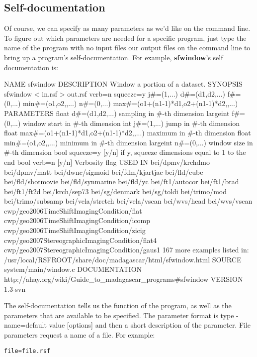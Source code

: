 \subsection{Self-documentation}
Of course, we can specify as many parameters as we'd like on the command line. To figure out which parameters are needed for a specific program, just type the name of the program with no input files our output files on the command line to bring up a program's self-documentation.  For example, \textbf{sfwindow}'s self documentation is:
\begin{verbatimtab}[4]
NAME
	sfwindow
DESCRIPTION
	Window a portion of a dataset. 
SYNOPSIS
	sfwindow < in.rsf > out.rsf verb=n squeeze=y 
        j#=(1,...) d#=(d1,d2,...) f#=(0,...) min#=(o1,o2,,...) 
        n#=(0,...) max#=(o1+(n1-1)*d1,o2+(n1-1)*d2,,...)
PARAMETERS
        float   d#=(d1,d2,...)  sampling in #-th dimension 
        largeint f#=(0,...)     window start in #-th dimension 
        int     j#=(1,...)      jump in #-th dimension 
        float   max#=(o1+(n1-1)*d1,o2+(n1-1)*d2,,...)   
            maximum in #-th dimension 
        float   min#=(o1,o2,,...)       minimum in #-th dimension 
        largeint n#=(0,...)     window size in #-th dimension 
        bool    squeeze=y [y/n] 
            if y, squeeze dimensions equal to 1 to the end 
        bool    verb=n [y/n]    Verbosity flag
USED IN
	bei/dpmv/krchdmo
	bei/dpmv/matt
	bei/dwnc/sigmoid
	bei/fdm/kjartjac
	bei/fld/cube
	bei/fld/shotmovie
	bei/fld/synmarine
	bei/fld/yc
	bei/ft1/autocor
	bei/ft1/brad
	bei/ft1/ft2d
	bei/krch/sep73
	bei/sg/denmark
	bei/sg/toldi
	bei/trimo/mod
	bei/trimo/subsamp
	bei/vela/stretch
	bei/vela/vscan
	bei/wvs/head
	bei/wvs/vscan
	cwp/geo2006TimeShiftImagingCondition/flat
	cwp/geo2006TimeShiftImagingCondition/icomp
	cwp/geo2006TimeShiftImagingCondition/zicig
	cwp/geo2007StereographicImagingCondition/flat4
	cwp/geo2007StereographicImagingCondition/gaus1
	167 more examples listed in:
	/usr/local/RSFROOT/share/doc/madagascar/html/sfwindow.html
SOURCE
	system/main/window.c
DOCUMENTATION
	http://ahay.org/wiki/Guide_to_madagascar_programs#sfwindow
VERSION
	1.3-svn
\end{verbatimtab}

The self-documentation tells us the function of the program, as well as the parameters that are available to be specified. The parameter format is type - name=default value [options] and then a short description of the parameter. File parameters request a name of a file. For example: 
\begin{verbatim} 
file=file.rsf 
\end{verbatim}

